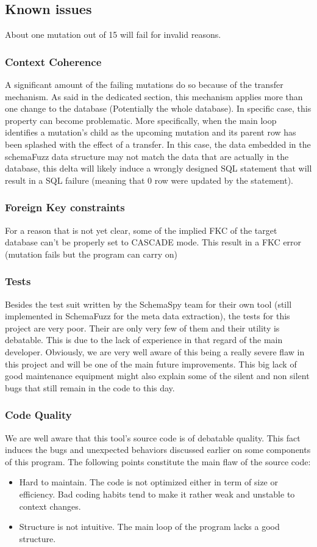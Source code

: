 \documentclass{article}
\begin{document}
\begin{empfile}
		\subsection{Known issues}		
About one mutation out of 15 will fail for invalid reasons.
			\subsubsection{Context Coherence}
A significant amount of the failing mutations do so because of the transfer mechanism. As said in the dedicated section, this mechanism applies more than one change to the database (Potentially the whole database). In specific case, this property can become problematic. 
More specifically, when the main loop identifies a mutation's child as the upcoming mutation and its parent row has been splashed with the effect of a transfer. In this case, the data embedded in the schemaFuzz data structure may not match the data that are actually in the database, this delta will likely induce a wrongly designed SQL statement that will result in a SQL failure (meaning that 0 row were updated by the statement).
			\subsubsection{Foreign Key constraints}			
For a reason that is not yet clear, some of the implied FKC of the target database can't be properly set to CASCADE mode. This result in a FKC error (mutation fails but the program can carry on)			
			\subsubsection{Tests}
Besides the test suit written by the SchemaSpy team for their own tool (still implemented in SchemaFuzz for the meta data extraction), the tests for this project are very poor. Their are only very few of them and their utility is debatable. This is due to the lack of experience in that regard of the main developer. Obviously, we are very well aware of this being a really severe flaw in this project and will be one of the main future improvements.
This big lack of good maintenance equipment might also explain some of the silent and non silent bugs that still remain in the code to this day.

			\subsubsection{Code Quality}
We are well aware that this tool's source code is of debatable quality. This fact induces the  bugs and unexpected behaviors discussed earlier on some components of this program. 
The following points constitute the main flaw of the source code:
			\begin{itemize}
			\item Hard to maintain. The code is not optimized either in term of size or 			efficiency. Bad coding habits tend to make it rather weak and unstable to context changes.
			\item Structure is not intuitive. The main loop of the program lacks a good 		structure.
			\end{itemize}
			

\end{empfile}
\end{document}
